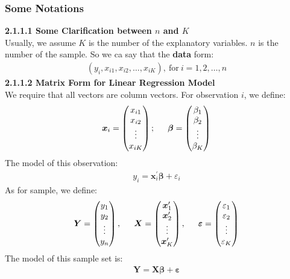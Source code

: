\documentclass{article}
\begin{document}
\subsubsection{Some Notations}
\textbf{2.1.1.1 Some Clarification between $n$ and $K$}\\
Usually, we assume $K$ is the number of the explanatory variables. $n$ is the number of the sample. So we ca say that the \textbf{data} form:
	\begin{align*}
		\left( y_i, x_{i1}, x_{i2}, \ldots, x_{iK} \right),\ \text{for}\ i = 1, 2, \ldots, n
	\end{align*}
\textbf{2.1.1.2 Matrix Form for Linear Regression Model}\\
We require that all vectors are column vectors.
For observation $i$, we define:
	\begin{align*}
		\boldsymbol{x}_i = \begin{pmatrix}
								x_{i1}\\
								x_{i2}\\
								\vdots\\
								x_{iK}
						   \end{pmatrix};\indent
		\boldsymbol{\beta} = \begin{pmatrix}
								\beta_1\\
								\beta_2\\
								\vdots\\
								\beta_K
							 \end{pmatrix}
	\end{align*}
The model of this observation:
	\begin{align*}
		y_i = \boldsymbol{x}^\prime_i\boldsymbol{\beta} + \varepsilon_i
	\end{align*}
As for sample, we define:
	\begin{align*}
		\boldsymbol{Y} = \begin{pmatrix}
							y_1\\
							y_2\\
							\vdots\\
							y_n
						 \end{pmatrix},\indent
		\boldsymbol{X} = \begin{pmatrix}
							\boldsymbol{x}^\prime_1\\
							\boldsymbol{x}^\prime_2\\
							\vdots\\
							\boldsymbol{x}^\prime_K
						 \end{pmatrix},\indent
		\boldsymbol{\varepsilon} = \begin{pmatrix}
										\varepsilon_1\\
										\varepsilon_2\\
										\vdots\\
										\varepsilon_K
								   \end{pmatrix}
	\end{align*}
The model of this sample set is:
	\begin{align*}
		\boldsymbol{Y} = \boldsymbol{X}\boldsymbol{\beta} + \boldsymbol{\varepsilon}
	\end{align*}
\end{document}
